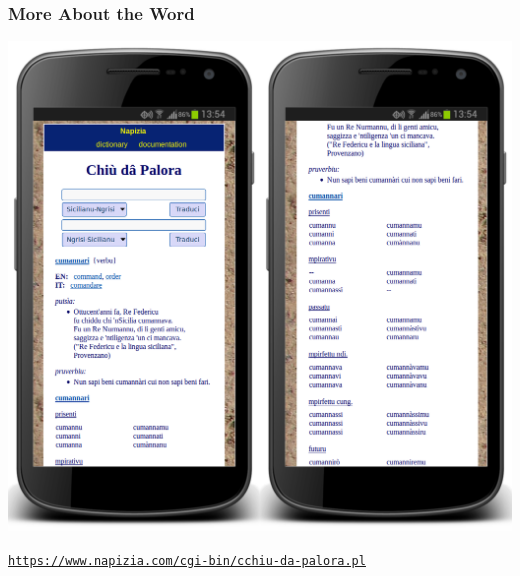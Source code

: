 \documentclass{beamer}
\begin{document}
\begin{frame}
  \frametitle{More About the Word}
  \vspace{-1.25em}
  \begin{center}
  \href{https://www.napizia.com/cgi-bin/cchiu-da-palora.pl}{%
    \includegraphics[height=0.755\textheight]{images/cdp_cumannari_v2.png}
  }
  \end{center}
  \vspace{-0.80em}
  \footnotesize{\href{https://www.napizia.com/cgi-bin/cchiu-da-palora.pl}{\texttt{https://www.napizia.com/cgi-bin/cchiu-da-palora.pl}}}
\end{frame}


\end{document}
